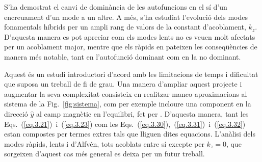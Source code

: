 S'ha demostrat el canvi de dominància de les autofuncions en el sí d'un encreuament d'un mode a un altre.
A més, s'ha estudiat l'evolució dels modes fonamentals híbrids per un ampli rang de valors de la constant d'acoblament, $k_z$.
D'aquesta manera es pot apreciar com els modes lents no es veuen molt afectats per un acoblament major,
mentre que els ràpids en pateixen les conseqüències de manera més notable, tant en l'autofunció dominant com en la no dominant.

Aquest és un estudi introductori d'acord amb les limitacions de temps i dificultat que suposa un treball de fi de grau.
Una manera d'ampliar aquest projecte i augmentar la seva complexitat consisteix en realitzar manco aproximacions al sistema de la Fig.~\ref{fig:sistema},
com per exemple incloure una component en la direcció $\hat{y}$ al camp magnètic en l'equilibri, fet per \textcite{oscillation_modes_III}.
D'aquesta manera, tant les Eqs.~(\ref{eq.3.21})~i~(\ref{eq.3.23}) com les Eqs.~(\ref{eq.3.30}),~(\ref{eq.3.31})~i~(\ref{eq.3.32}) estan compostes per termes extres tals que lliguen dites equacions.
L'anàlisi dels modes ràpids, lents i d'Alfvén, tots acoblats entre sí excepte per $k_z = 0$, que sorgeixen d'aquest cas més general es deixa per un futur treball.